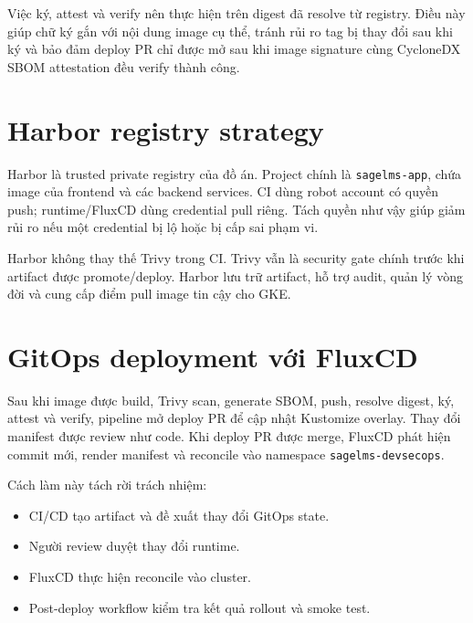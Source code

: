 Việc ký, attest và verify nên thực hiện trên digest đã resolve từ registry. Điều này giúp chữ ký gắn với nội dung image cụ thể, tránh rủi ro tag bị thay đổi sau khi ký và bảo đảm deploy PR chỉ được mở sau khi image signature cùng CycloneDX SBOM attestation đều verify thành công.

\section{Harbor registry strategy}

Harbor là trusted private registry của đồ án. Project chính là \texttt{sagelms-app}, chứa image của frontend và các backend services. CI dùng robot account có quyền push; runtime/FluxCD dùng credential pull riêng. Tách quyền như vậy giúp giảm rủi ro nếu một credential bị lộ hoặc bị cấp sai phạm vi.

Harbor không thay thế Trivy trong CI. Trivy vẫn là security gate chính trước khi artifact được promote/deploy. Harbor lưu trữ artifact, hỗ trợ audit, quản lý vòng đời và cung cấp điểm pull image tin cậy cho GKE.

\section{GitOps deployment với FluxCD}

Sau khi image được build, Trivy scan, generate SBOM, push, resolve digest, ký, attest và verify, pipeline mở deploy PR để cập nhật Kustomize overlay. Thay đổi manifest được review như code. Khi deploy PR được merge, FluxCD phát hiện commit mới, render manifest và reconcile vào namespace \texttt{sagelms-devsecops}.

Cách làm này tách rời trách nhiệm:

\begin{itemize}
  \item CI/CD tạo artifact và đề xuất thay đổi GitOps state.
  \item Người review duyệt thay đổi runtime.
  \item FluxCD thực hiện reconcile vào cluster.
  \item Post-deploy workflow kiểm tra kết quả rollout và smoke test.
\end{itemize}

\label{fig:gitops-flow}

